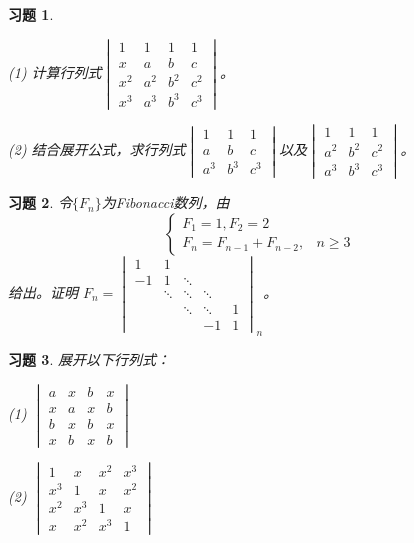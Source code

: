 \documentclass[a4paper]{book}
\newtheorem{ex}{习题}[chapter]
\newcommand{\enum}{\begin{list}{}{\setlength{\leftmargin}{0pt} \setlength{\itemindent}{2.5em} \setlength{\listparindent}{2em}}}
\begin{document}
\begin{ex}\  \label{ex:2.13}

\enum
\item[(1)] 计算行列式$\begin{vmatrix} 1 & 1 & 1 & 1 \\ x & a & b & c \\ x^2 & a^2 & b^2 & c^2 \\ x^3 & a^3 & b^3 & c^3 \end{vmatrix}$。
\item[(2)] 结合展开公式，求行列式$\begin{vmatrix} 1 & 1 & 1 \\ a & b & c \\ a^3 & b^3 & c^3 \end{vmatrix}$以及$\begin{vmatrix} 1 & 1 & 1 \\ a^2 & b^2 & c^2 \\ a^3 & b^3 & c^3 \end{vmatrix}$。
\end{list}
\end{ex}

\begin{ex} \label{ex:2.14}
令$\{F_n\}$为Fibonacci数列，由
$$
\begin{cases}
F_1 = 1, F_2 = 2 \\
F_n = F_{n-1} + F_{n-2}, & n \geqslant 3
\end{cases}
$$
给出。证明
$F_n = \begin{vmatrix} 1 & 1 & & & \\ -1 & 1 & \ddots & & \\ & \ddots & \ddots & \ddots & \\ & & \ddots & \ddots & 1 \\ & & & -1 & 1 \end{vmatrix}_{n}$。
\end{ex}

\begin{ex} \label{ex:2.15}
展开以下行列式：

\enum
\item[(1)] $\begin{vmatrix} a & x & b & x \\ x & a & x & b \\ b & x & b & x \\ x & b & x & b \end{vmatrix}$
\item[(2)] $\begin{vmatrix} 1 & x & x^2 & x^3 \\ x^3 & 1 & x & x^2 \\ x^2 & x^3 & 1 & x \\ x & x^2 & x^3 & 1 \end{vmatrix}$
\end{list}
\end{ex}
\end{document}
